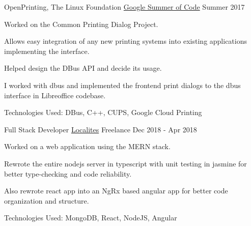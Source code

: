 \begin{cventries}
  \cventry
  {OpenPrinting, The Linux Foundation}
  {\href{https://yashsriv.org/2017/08/gsoc.html}{Google Summer of Code}}
  {}
  {Summer 2017}
  {
    \begin{cvitems}
      \item Worked on the Common Printing Dialog Project.
      \item Allows easy integration of any new printing systems into existing
        applications implementing the interface.
      \item Helped design the DBus API and decide its usage.
      \item I worked with dbus and implemented the frontend print dialogs to the
        dbus interface in Libreoffice codebase.
        \ifdefined \ONEPAGE \else
      \item Technologies Used: DBus, C++, CUPS, Google Cloud Printing
        \fi
    \end{cvitems}
  }

\ifdefined\ONEPAGE
\else
  \cventry
  {Full Stack Developer}
  {\href{http://www.localites.com}{Localites}}
  {Freelance}
  {Dec 2018 - Apr 2018}
  {
    \begin{cvitems}
    \item Worked on a web application using the MERN stack.
    \item Rewrote the entire nodejs server in typescript with unit testing in
      jasmine for better type-checking and code reliability.
    \item Also rewrote react app into an NgRx based angular app for better code
      organization and structure.
    \item Technologies Used: MongoDB, React, NodeJS, Angular
    \end{cvitems}
  }
  \fi

\end{cventries}

